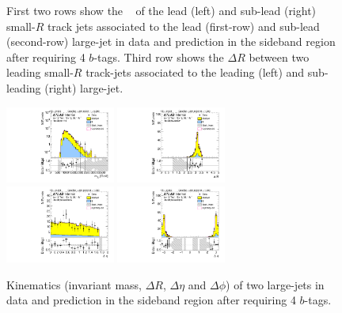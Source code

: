 \begin{figure}[htbp!]
\begin{center}
  \caption{First two rows show the \pt~ of the lead (left) and sub-lead (right) small-$R$ track jets associated to the lead (first-row) and sub-lead (second-row) large-\R jet in data and prediction in the sideband region after requiring 4 $b$-tags. Third row shows the $\Delta R$ between two leading small-$R$ track-jets associated to the leading (left) and sub-leading (right) large-\R jet. }
  \label{fig:boosted-4b-sideband-ak2}
\end{center}
\end{figure}


\begin{figure}[htbp!]
\begin{center}
\includegraphics[width=0.32\textwidth,angle=-90]{figures/boosted/Sideband/b77_FourTag_Sideband_mHH_l_1.pdf}
\includegraphics[width=0.32\textwidth,angle=-90]{figures/boosted/Sideband/b77_FourTag_Sideband_hCandDr.pdf}\\
\includegraphics[width=0.32\textwidth,angle=-90]{figures/boosted/Sideband/b77_FourTag_Sideband_hCandDeta.pdf}
\includegraphics[width=0.32\textwidth,angle=-90]{figures/boosted/Sideband/b77_FourTag_Sideband_hCandDphi.pdf}
  \caption{Kinematics (invariant mass, $\Delta R$, $\Delta \eta$ and $\Delta \phi$) of two large-\R jets in data and prediction in the sideband region after requiring 4 $b$-tags. }
  \label{fig:boosted-4b-sideband-ak10-system}
\end{center}
\end{figure}

